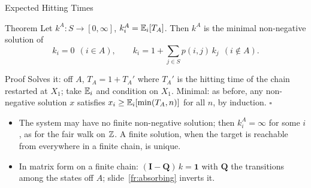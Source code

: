 \begin{frame}{Expected Hitting Times}
  \label{fr:khit}
  \small
  \begin{block}{Theorem}
    Let $k^A\colon S\to[0,\infty]$, $k^A_i=\mathbb{E}_i[T_A]$. Then $k^A$ is the minimal non-negative solution of
    \[
      k_i=0\ \ (i\in A),\qquad k_i=1+\sum_{j\in S}p(i,j)\,k_j\ \ (i\notin A).
    \]
  \end{block}
  \begin{block}{Proof}
    Solves it: off $A$, $T_A=1+T_A'$ where $T_A'$ is the hitting time of the chain restarted at $X_1$; take $\mathbb{E}_i$ and condition on $X_1$. Minimal: as before, any non-negative solution $x$ satisfies $x_i\ge\mathbb{E}_i[\min(T_A,n)]$ for all $n$, by induction. \hfill$\square$
  \end{block}
  \begin{itemize}
    \item The system may have no finite non-negative solution; then $k^A_i=\infty$ for some $i$, as for the fair walk on $\mathbb{Z}$. A finite solution, when the target is reachable from everywhere in a finite chain, is unique.
    \item In matrix form on a finite chain: $(\mathbf I-\mathbf Q)\,k=\mathbf 1$ with $\mathbf Q$ the transitions among the states off $A$; slide~\ref{fr:absorbing} inverts it.
  \end{itemize}
\end{frame}

